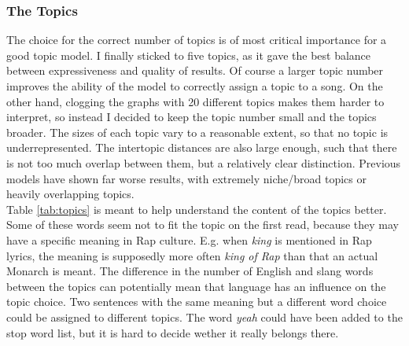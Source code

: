 \documentclass[conference]{IEEEtran}
\begin{document}
\subsubsection{The Topics}
The choice for the correct number of topics is of most critical importance for a good topic model. I finally sticked to five topics, as it gave the best balance between expressiveness and quality of results. Of course a larger topic number improves the ability of the model to correctly assign a topic to a song. On the other hand, clogging the graphs with 20 different topics makes them harder to interpret, so instead I decided to keep the topic number small and the topics broader. The sizes of each topic vary to a reasonable extent, so that no topic is underrepresented. The intertopic distances are also large enough, such that there is not too much overlap between them, but a relatively clear distinction. Previous models have shown far worse results, with extremely niche/broad topics or heavily overlapping topics.\\
Table \ref{tab:topics} is meant to help understand the content of the topics better. Some of these words seem not to fit the topic on the first read, because they may have a specific meaning in Rap culture. E.g. when \textit{king} is mentioned in Rap lyrics, the meaning is supposedly more often \textit{king of Rap} than that an actual Monarch is meant. The difference in the number of English and slang words between the topics can potentially mean that language has an influence on the topic choice. Two sentences with the same meaning but a different word choice could be assigned to different topics. The word \textit{yeah} could have been added to the stop word list, but it is hard to decide wether it really belongs there.
\end{document}
